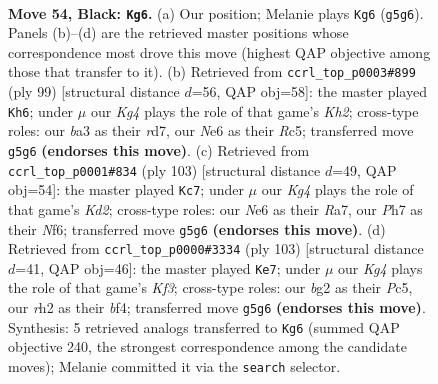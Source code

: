 \documentclass[11pt]{article}
\begin{document}
\clearpage

\begin{figure}[p]\centering
\begin{subfigure}{0.46\textwidth}\centering
\resizebox{\linewidth}{!}{%
\newchessgame
\chessboard[
  setfen={3r1b2/7p/p2pn3/P3p1kp/2P1P3/BP3P2/3K2BR/8 b - - 5 54},
  showmover=false,
  pgfstyle=straightmove, color=movearrow, markmove={g5-g6}
]}
\caption{}
\end{subfigure}\hfill
\begin{subfigure}{0.46\textwidth}\centering
\resizebox{\linewidth}{!}{%
\newchessgame
\chessboard[
  setfen={8/3R2pk/5p2/1pr5/p1b2PPp/P1B1K2P/1P6/8 b - - 7 50},
  showmover=false,
  pgfstyle=straightmove, color=movearrow, markmove={h7-h6}
]}
\caption{}
\end{subfigure}
\\[4pt]
\begin{subfigure}{0.46\textwidth}\centering
\resizebox{\linewidth}{!}{%
\newchessgame
\chessboard[
  setfen={7R/r2k2p1/3b1n1p/1P1pp3/5p1P/1B3P2/1BP1KP2/8 b - - 0 52},
  showmover=false,
  pgfstyle=straightmove, color=movearrow, markmove={d7-c7}
]}
\caption{}
\end{subfigure}\hfill
\begin{subfigure}{0.46\textwidth}\centering
\resizebox{\linewidth}{!}{%
\newchessgame
\chessboard[
  setfen={r7/8/3p1k2/p1pP1p2/2P1nB1p/RP5P/4K1P1/8 b - - 9 52},
  showmover=false,
  pgfstyle=straightmove, color=movearrow, markmove={f6-e7}
]}
\caption{}
\end{subfigure}
\caption{\textbf{Move 54, Black: \texttt{Kg6}.} (a) Our position; Melanie plays \texttt{Kg6} (\texttt{g5g6}). Panels (b)--(d) are the retrieved master positions whose correspondence most drove this move (highest QAP objective among those that transfer to it). (b) Retrieved from \texttt{ccrl\_top\_p0003\#899} (ply 99) [structural distance $d$=56, QAP obj=58]: the master played \texttt{Kh6}; under $\mu$ our \emph{Kg4} plays the role of that game's \emph{Kh2}; cross-type roles: our \emph{b}a3 as their \emph{r}d7, our \emph{N}e6 as their \emph{R}c5; transferred move \texttt{g5g6} \textbf{(endorses this move)}. (c) Retrieved from \texttt{ccrl\_top\_p0001\#834} (ply 103) [structural distance $d$=49, QAP obj=54]: the master played \texttt{Kc7}; under $\mu$ our \emph{Kg4} plays the role of that game's \emph{Kd2}; cross-type roles: our \emph{N}e6 as their \emph{R}a7, our \emph{P}h7 as their \emph{N}f6; transferred move \texttt{g5g6} \textbf{(endorses this move)}. (d) Retrieved from \texttt{ccrl\_top\_p0000\#3334} (ply 103) [structural distance $d$=41, QAP obj=46]: the master played \texttt{Ke7}; under $\mu$ our \emph{Kg4} plays the role of that game's \emph{Kf3}; cross-type roles: our \emph{b}g2 as their \emph{P}c5, our \emph{r}h2 as their \emph{b}f4; transferred move \texttt{g5g6} \textbf{(endorses this move)}. Synthesis: 5 retrieved analogs transferred to \texttt{Kg6} (summed QAP objective 240, the strongest correspondence among the candidate moves); Melanie committed it via the \texttt{search} selector.}
\label{fig:thought-m107}
\end{figure}
\end{document}

